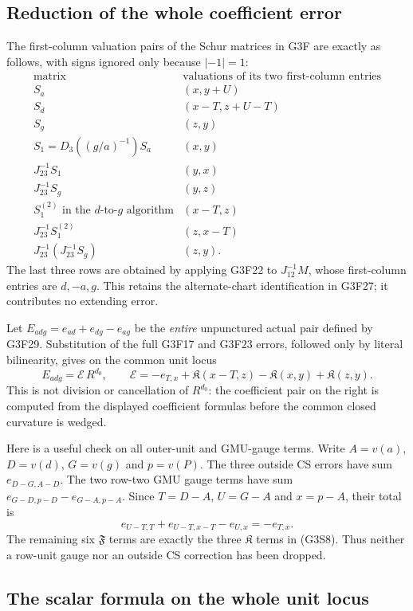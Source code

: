 \subsection{Reduction of the whole coefficient error}

The first-column valuation pairs of the Schur matrices in G3F are
exactly as follows, with signs ignored only because $|-1|=1$:
\[
\begin{array}{c|c}
\text{matrix}&\text{valuations of its two first-column entries}\\\hline
S_a&(x,y+U)\\
S_d&(x-T,z+U-T)\\
S_g&(z,y)\\
S_1=D_3((g/a)^{-1})S_a&(x,y)\\
J_{23}^{-1}S_1&(y,x)\\
J_{23}^{-1}S_g&(y,z)\\
S_1^{(2)}\text{ in the }d\text{-to-}g\text{ algorithm}&(x-T,z)\\
J_{23}^{-1}S_1^{(2)}&(z,x-T)\\
J_{23}^{-1}(J_{23}^{-1}S_g)&(z,y).
\end{array}
 \tag{G3S7}
\]
The last three rows are obtained by applying G3F22 to
$J_{12}^{-1}M$, whose first-column entries are $d,-a,g$.
This retains the alternate-chart identification in G3F27; it
contributes no extending error.

Let $E_{adg}=e_{ad}+e_{dg}-e_{ag}$ be the \emph{entire}
unpunctured actual pair defined by G3F29.  Substitution of the
full G3F17 and G3F23 errors, followed only by literal bilinearity,
gives on the common unit locus
\[
 E_{adg}=\mathcal E\,R^{d_0},\qquad
 \mathcal E=-e_{T,x}+\mathfrak K(x-T,z)
                         -\mathfrak K(x,y)+\mathfrak K(z,y).
 \tag{G3S8}
\]
This is not division or cancellation of $R^{d_0}$: the coefficient
pair on the right is computed from the displayed coefficient
formulas before the common closed curvature is wedged.

Here is a useful check on all outer-unit and GMU-gauge terms.
Write $A=v(a)$, $D=v(d)$, $G=v(g)$ and $p=v(P)$.
The three outside CS errors have sum $e_{D-G,A-D}$.
The two row-two GMU gauge terms have sum
$e_{G-D,p-D}-e_{G-A,p-A}$.  Since $T=D-A$, $U=G-A$ and
$x=p-A$, their total is
\[
 e_{U-T,T}+e_{U-T,x-T}-e_{U,x}=-e_{T,x}.
 \tag{G3S9}
\]
The remaining six $\mathfrak F$ terms are exactly the three
$\mathfrak K$ terms in (G3S8).  Thus neither a row-unit gauge
nor an outside CS correction has been dropped.

\subsection{The scalar formula on the whole unit locus}

